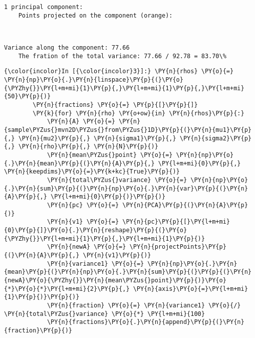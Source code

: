     \begin{center}
    \end{center}
    { \hspace*{\fill} \\}
    
    \begin{Verbatim}[commandchars=\\\{\}]

1 principal component:
	Points projected on the component (orange):

    \end{Verbatim}

    \begin{center}
    \end{center}
    { \hspace*{\fill} \\}
    
    \begin{Verbatim}[commandchars=\\\{\}]
	Variance along the component: 77.66
	The fration of the total variance: 77.66 / 92.78 = 83.70\%

    \end{Verbatim}

    \begin{Verbatim}[commandchars=\\\{\}]
{\color{incolor}In [{\color{incolor}3}]:} \PY{n}{rhos} \PY{o}{=} \PY{n}{np}\PY{o}{.}\PY{n}{linspace}\PY{p}{(}\PY{o}{\PYZhy{}}\PY{l+m+mi}{1}\PY{p}{,}\PY{l+m+mi}{1}\PY{p}{,}\PY{l+m+mi}{50}\PY{p}{)}
        \PY{n}{fractions} \PY{o}{=} \PY{p}{[}\PY{p}{]}
        \PY{k}{for} \PY{n}{rho} \PY{o+ow}{in} \PY{n}{rhos}\PY{p}{:}
            \PY{n}{A} \PY{o}{=} \PY{n}{sample\PYZus{}mvn2D\PYZus{}from\PYZus{}1D}\PY{p}{(}\PY{n}{mu1}\PY{p}{,} \PY{n}{mu2}\PY{p}{,} \PY{n}{sigma1}\PY{p}{,} \PY{n}{sigma2}\PY{p}{,} \PY{n}{rho}\PY{p}{,} \PY{n}{N}\PY{p}{)}
            \PY{n}{mean\PYZus{}point} \PY{o}{=} \PY{n}{np}\PY{o}{.}\PY{n}{mean}\PY{p}{(}\PY{n}{A}\PY{p}{,} \PY{l+m+mi}{0}\PY{p}{,} \PY{n}{keepdims}\PY{o}{=}\PY{k+kc}{True}\PY{p}{)}
            \PY{n}{total\PYZus{}variance} \PY{o}{=} \PY{n}{np}\PY{o}{.}\PY{n}{sum}\PY{p}{(}\PY{n}{np}\PY{o}{.}\PY{n}{var}\PY{p}{(}\PY{n}{A}\PY{p}{,} \PY{l+m+mi}{0}\PY{p}{)}\PY{p}{)}
            \PY{n}{pc} \PY{o}{=} \PY{n}{PCA}\PY{p}{(}\PY{n}{A}\PY{p}{)}
            \PY{n}{v1} \PY{o}{=} \PY{n}{pc}\PY{p}{[}\PY{l+m+mi}{0}\PY{p}{]}\PY{o}{.}\PY{n}{reshape}\PY{p}{(}\PY{o}{\PYZhy{}}\PY{l+m+mi}{1}\PY{p}{,}\PY{l+m+mi}{1}\PY{p}{)}
            \PY{n}{newA} \PY{o}{=} \PY{n}{projectPoints}\PY{p}{(}\PY{n}{A}\PY{p}{,} \PY{n}{v1}\PY{p}{)}
            \PY{n}{variance1} \PY{o}{=} \PY{n}{np}\PY{o}{.}\PY{n}{mean}\PY{p}{(}\PY{n}{np}\PY{o}{.}\PY{n}{sum}\PY{p}{(}\PY{p}{(}\PY{n}{newA}\PY{o}{\PYZhy{}}\PY{n}{mean\PYZus{}point}\PY{p}{)}\PY{o}{*}\PY{o}{*}\PY{l+m+mi}{2}\PY{p}{,} \PY{n}{axis}\PY{o}{=}\PY{l+m+mi}{1}\PY{p}{)}\PY{p}{)}
            \PY{n}{fraction} \PY{o}{=} \PY{n}{variance1} \PY{o}{/} \PY{n}{total\PYZus{}variance} \PY{o}{*} \PY{l+m+mi}{100}
            \PY{n}{fractions}\PY{o}{.}\PY{n}{append}\PY{p}{(}\PY{n}{fraction}\PY{p}{)}
\end{Verbatim}

